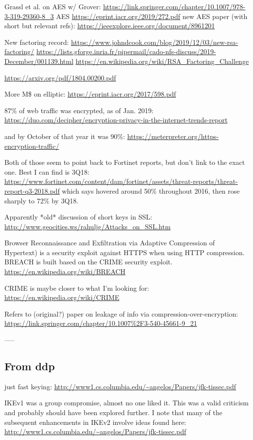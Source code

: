\documentclass[%
 aip,
 jmp,%
 amsmath,amssymb,
 reprint,%
]{revtex4-1}
\begin{document}
Grassl et al. on AES w/ Grover:
\url{https://link.springer.com/chapter/10.1007/978-3-319-29360-8_3}
AES
\url{https://eprint.iacr.org/2019/272.pdf}
new AES paper (with short but relevant refs):
\url{https://ieeexplore.ieee.org/document/8961201}

New factoring record:
\url{https://www.johndcook.com/blog/2019/12/03/new-rsa-factoring/}
\url{https://lists.gforge.inria.fr/pipermail/cado-nfs-discuss/2019-December/001139.html}
\url{https://en.wikipedia.org/wiki/RSA_Factoring_Challenge}

\url{https://arxiv.org/pdf/1804.00200.pdf}

More M\$ on elliptic:
\url{https://eprint.iacr.org/2017/598.pdf}

87\% of web traffic was encrypted, as of Jan. 2019:
\url{https://duo.com/decipher/encryption-privacy-in-the-internet-trends-report}

and by October of that year it was 90\%:
\url{https://meterpreter.org/https-encryption-traffic/}

Both of those seem to point back to Fortinet reports, but don't link
to the exact one.  Best I can find is 3Q18:
\url{https://www.fortinet.com/content/dam/fortinet/assets/threat-reports/threat-report-q3-2018.pdf}
which says hovered around 50\% throughout 2016, then rose sharply to
72\% by 3Q18.

Apparently *old* discussion of short keys in SSL:
\url{http://www.geocities.ws/rahuljg/Attacks_on_SSL.htm}

Browser Reconnaissance and Exfiltration via Adaptive Compression of
Hypertext) is a security exploit against HTTPS when using HTTP
compression. BREACH is built based on the CRIME security exploit.
\url{https://en.wikipedia.org/wiki/BREACH}

CRIME is maybe closer to what I'm looking for:
\url{https://en.wikipedia.org/wiki/CRIME}

Refers to (original?) paper on leakage of info via
compression-over-encryption:
\url{https://link.springer.com/chapter/10.1007%2F3-540-45661-9_21}

-----

\subsection{From ddp}

just fast keying:
\url{http://www1.cs.columbia.edu/~angelos/Papers/jfk-tissec.pdf}

IKEv1 was a group compromise, almost no one liked it.  This was a valid criticism and probably should have been explored further.  I note that many of the subsequent enhancements in IKEv2 involve ideas found here:
\url{http://www1.cs.columbia.edu/~angelos/Papers/jfk-tissec.pdf}
\end{document}
